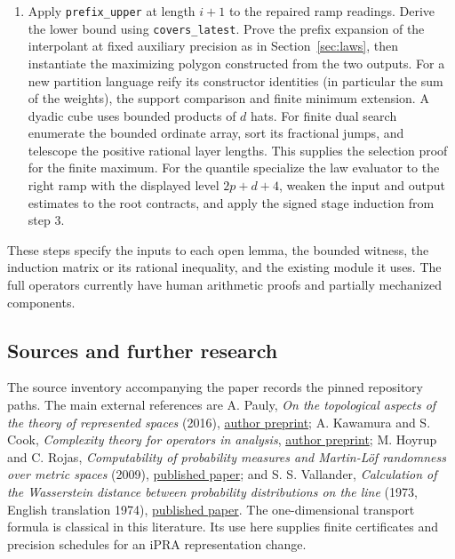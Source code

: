 \begin{enumerate}[leftmargin=*]
is PR. At a fixed cut maintain the cumulative crossing flow and use the common
mass-coordinate formula of Lemma~\ref{lem:dual}. Use the repository's
\texttt{Sums.abel\_summation} for the signed equality after denominator
clearing, splitting signed terms into their natural components. The finite
host specification checks the index and boundary conventions.
\item Apply \texttt{prefix\_upper} at length $i+1$ to the repaired ramp readings.
Derive the lower bound using \texttt{covers\_latest}. Prove the prefix
expansion of the interpolant at fixed auxiliary precision as in
Section~\ref{sec:laws}, then instantiate the maximizing polygon constructed
from the two outputs. For a new partition language reify its constructor
identities (in particular the sum of the weights), the support comparison and
finite minimum extension. A dyadic cube uses bounded products of $d$ hats.
For finite dual search enumerate the bounded ordinate array, sort its
fractional jumps, and telescope the positive rational layer lengths. This
supplies the selection proof for the finite maximum. For the quantile
specialize the law evaluator to the right ramp with the displayed level
$2p+d+4$, weaken the input and output estimates to the root contracts,
and apply the signed stage induction from step 3.
\end{enumerate}
These steps specify the inputs to each open lemma, the bounded witness, the
induction matrix or its rational inequality, and the existing module it uses.
The full operators currently have human arithmetic proofs and partially
mechanized components.

\subsection{Sources and further research}

The source inventory accompanying the paper records the pinned repository
paths. The main external references are
A. Pauly, \emph{On the topological aspects of the theory of represented
spaces} (2016), \href{https://arxiv.org/abs/1204.3763}{author preprint};
A. Kawamura and S. Cook, \emph{Complexity theory for operators in analysis},
\href{https://arxiv.org/abs/1305.0453}{author preprint};
M. Hoyrup and C. Rojas, \emph{Computability of probability measures and
Martin-L\"of randomness over metric spaces} (2009),
\href{https://doi.org/10.1016/j.ic.2008.12.009}{published paper}; and
S. S. Vallander, \emph{Calculation of the Wasserstein distance between
probability distributions on the line} (1973, English translation 1974),
\href{https://doi.org/10.1137/1118101}{published paper}.
The one-dimensional transport formula is classical in this literature. Its
use here supplies finite certificates and precision schedules for an
iPRA representation change.

